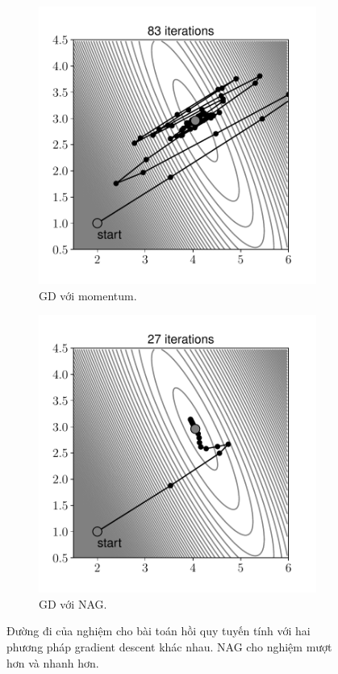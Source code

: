 \begin{figure}[t]
\begin{subfigure}{0.49\textwidth}
\includegraphics[width=0.99\linewidth]{ebookML_src/src/grad_descent/LR_gd_moment.pdf}
\caption{GD với momentum.}
\label{fig:8_momentnaga}
\end{subfigure}
\begin{subfigure}{0.49\textwidth}
\includegraphics[width=0.99\linewidth]{ebookML_src/src/grad_descent/LR_gd_nag.pdf}
\caption{GD với NAG.}
\label{fig:8_momentnagb}
\end{subfigure}
\caption{
Đường đi của nghiệm cho bài toán hồi quy tuyến tính với hai phương pháp
gradient descent khác nhau. NAG cho nghiệm mượt hơn và nhanh hơn.
}
\label{fig:8_momentnag}
\end{figure}


